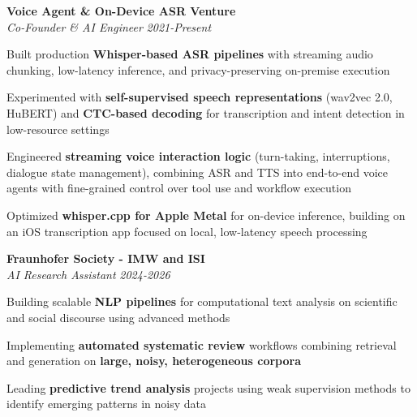 \documentclass[margin,line]{resume}
\begin{document}
\begin{resume}
        \textbf{Voice Agent \& On-Device ASR Venture}\\
        \textit{Co-Founder \& AI Engineer} \hfill \textsl{2021-Present}\\
        \begin{list2}\setlength\itemsep{0.75mm}
        \item Built production \textbf{Whisper-based ASR pipelines} with streaming audio chunking, low-latency inference, and privacy-preserving on-premise execution
        \item Experimented with \textbf{self-supervised speech representations} (wav2vec 2.0, HuBERT) and \textbf{CTC-based decoding} for transcription and intent detection in low-resource settings
        \item Engineered \textbf{streaming voice interaction logic} (turn-taking, interruptions, dialogue state management), combining ASR and TTS into end-to-end voice agents with fine-grained control over tool use and workflow execution
        \item Optimized \textbf{whisper.cpp for Apple Metal} for on-device inference, building on an iOS transcription app focused on local, low-latency speech processing
        \end{list2}

        \textbf{Fraunhofer Society - IMW and ISI}\\
        \textit{AI Research Assistant} \hfill \textsl{2024-2026}\\
        \begin{list2}\setlength\itemsep{0.75mm}
        \item Building scalable \textbf{NLP pipelines} for computational text analysis on scientific and social discourse using advanced methods
        \item Implementing \textbf{automated systematic review} workflows combining retrieval and generation on \textbf{large, noisy, heterogeneous corpora}
        \item Leading \textbf{predictive trend analysis} projects using weak supervision methods to identify emerging patterns in noisy data
        \end{list2}

        \newpage


\end{resume}
\end{document}
